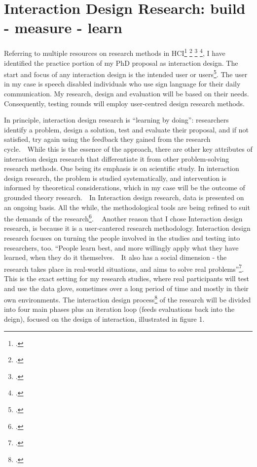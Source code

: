 \section{Interaction Design Research: build - measure - learn}

Referring to multiple resources on research methods in HCI\footcite{Cox2008} \footcite{Dix2004} \footcite{Lazar2010} \footcite{Zimmerman:2007:RTD:1240624.1240704}, I have identified the practice portion of my PhD proposal as interaction design. The start and focus of any interaction design is the intended user or users\footcite{Dix2004}. The user in my case is speech disabled individuals who use sign language for their daily communication. My research, design and evaluation will be based on their needs. Consequently, testing rounds will employ user-centred design research methods.

In principle, interaction design research is ``learning by doing'': researchers identify a problem, design a solution, test and evaluate their proposal, and if not satisfied, try again using the feedback they gained from the research cycle.  While this is the essence of the approach, there are other key attributes of interaction design research that differentiate it from other problem-solving research methods. One being its emphasis is on scientific study. In interaction design research, the problem is studied systematically, and intervention is informed by theoretical considerations, which in my case will be the outcome of grounded theory research.  In Interaction design research, data is presented on an ongoing basis. All the while, the methodological tools are being refined to suit the demands of the research\footcite{OBrienRoryFacultyofInformationStudies2001}. 
 
Another reason that I chose Interaction design research, is because it is a user-cantered research methodology. Interaction design research focuses on turning the people involved in the studies and testing into researchers, too. ``People learn best, and more willingly apply what they have learned, when they do it themselves.  It also has a social dimension - the research takes place in real-world situations, and aims to solve real problems''\footcite{OBrienRoryFacultyofInformationStudies2001}. This is the exact setting for my research studies, where real participants will test and use the data glove, sometimes over a long period of time and mostly in their own environments.
The interaction design process\footcite{Dix2004} of the research will be divided into four main phases plus an iteration loop (feeds evaluations back into the deign), focused on the design of interaction, illustrated in figure 1.

